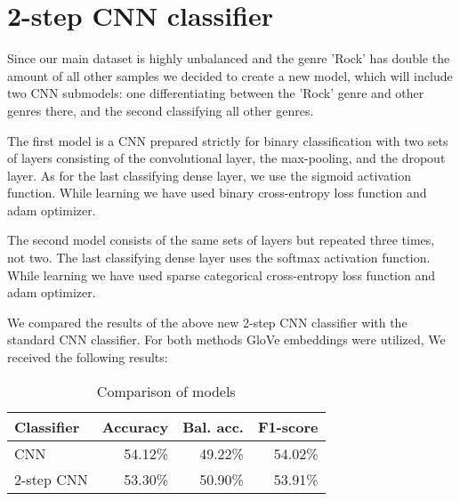 \section{2-step CNN classifier}

Since our main dataset is highly unbalanced and the genre 'Rock' has double the amount of all other samples we decided to create a new model, which will include two CNN submodels: one differentiating between the 'Rock' genre and other genres there, and the second classifying all other genres.

The first model is a CNN prepared strictly for binary classification with two sets of layers consisting of the convolutional layer, the max-pooling, and the dropout layer. As for the last classifying dense layer, we use the sigmoid activation function. While learning we have used binary cross-entropy loss function and adam optimizer.

The second model consists of the same sets of layers but repeated three times, not two. The last classifying dense layer uses the softmax activation function. While learning we have used sparse categorical cross-entropy loss function and adam optimizer.

We compared the results of the above new 2-step CNN classifier with the standard CNN classifier. For both methods GloVe embeddings were utilized, We received the following results:

\begin{table}[!h]
\centering
\begin{tabular}{l|r|r|r}
\textbf{Classifier} & \textbf{Accuracy} & \textbf{Bal. acc.}  & \textbf{F1-score} \\ \hline
CNN         & 54.12\%           & 49.22\%           & 54.02\%          \\
2-step CNN  & 53.30\%           & 50.90\%           & 53.91\%           
\end{tabular}
\caption{Comparison of models}
\end{table}

